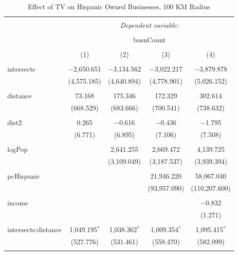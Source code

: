 
\begin{table}[!htbp] \centering 
  \caption{Effect of TV on Hispanic Owned Businesses, 100 KM Radius} 
  \label{} 
\begin{tabular}{@{\extracolsep{-5pt}}lcccc} 
\\[-1.8ex]\hline 
\hline \\[-1.8ex] 
 & \multicolumn{4}{c}{\textit{Dependent variable:}} \\ 
\cline{2-5} 
\\[-1.8ex] & \multicolumn{4}{c}{busnCount} \\ 
\\[-1.8ex] & (1) & (2) & (3) & (4)\\ 
\hline \\[-1.8ex] 
 intersects & $-$2,650.651 & $-$3,134.562 & $-$3,022.217 & $-$3,879.878 \\ 
  & (4,575.185) & (4,640.894) & (4,778.901) & (5,026.152) \\ 
  & & & & \\ 
 distance & 73.168 & 175.346 & 172.329 & 302.614 \\ 
  & (668.529) & (683.666) & (700.541) & (738.632) \\ 
  & & & & \\ 
 dist2 & 0.265 & $-$0.616 & $-$0.436 & $-$1.795 \\ 
  & (6.771) & (6.895) & (7.106) & (7.508) \\ 
  & & & & \\ 
 logPop &  & 2,641.255 & 2,669.472 & 4,139.725 \\ 
  &  & (3,109.049) & (3,187.537) & (3,939.394) \\ 
  & & & & \\ 
 pcHispanic &  &  & 21,946.220 & 58,067.040 \\ 
  &  &  & (93,957.090) & (110,207.600) \\ 
  & & & & \\ 
 income &  &  &  & $-$0.832 \\ 
  &  &  &  & (1.271) \\ 
  & & & & \\ 
 intersects:distance & 1,049.195$^{*}$ & 1,038.362$^{*}$ & 1,009.354$^{*}$ & 1,095.415$^{*}$ \\ 
  & (527.776) & (531.461) & (558.470) & (582.099) \\ 
  & & & & \\ 

\end{tabular}
\end{table}
